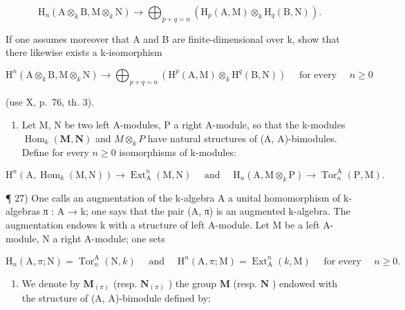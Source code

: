 \[
\mathrm{H} _ {n} (\mathrm{A} \otimes_ {k} \mathrm{B}, \mathrm{M} \otimes_ {k} \mathrm{N}) \rightarrow \bigoplus_ {p + q = n} \left(\mathrm{H} _ {p} (\mathrm{A}, \mathrm{M}) \otimes_ {k} \mathrm{H} _ {q} (\mathrm{B}, \mathrm{N})\right).
\]

If one assumes moreover that A and B are finite-dimensional over k, show that there likewise exists a k-isomorphism

\[
\mathrm{H} ^ {n} (\mathrm{A} \otimes_ {k} \mathrm{B}, \mathrm{M} \otimes_ {k} \mathrm{N}) \rightarrow \bigoplus_ {p + q = n} \left(\mathrm{H} ^ {p} (\mathrm{A}, \mathrm{M}) \otimes_ {k} \mathrm{H} ^ {q} (\mathrm{B}, \mathrm{N})\right) \quad \text { for   every } \quad n \geqslant 0
\]

(use X, p.~76, th. 3).

\begin{enumerate}
\def\labelenumi{\alph{enumi})}
\setcounter{enumi}{4}
\tightlist
\item
  Let M, N be two left A-modules, P a right A-module, so that the k-modules \(\operatorname{Hom}_{k}(\mathbf{M}, \mathbf{N})\) and \(M \otimes_{k} P\) have natural structures of (A, A)-bimodules. Define for every \(n \geqslant 0\) isomorphisms of k-modules:
\end{enumerate}

\[
\mathrm{H} ^ {n} (\mathrm{A}, \operatorname{Hom} _ {k} (\mathrm{M}, \mathrm{N})) \rightarrow \operatorname{Ext} _ {\mathrm{A}} ^ {n} (\mathrm{M}, \mathrm{N}) \quad \text { and } \quad \mathrm{H} _ {n} (\mathrm{A}, \mathrm{M} \otimes_ {k} \mathrm{P}) \rightarrow \operatorname{Tor} _ {n} ^ {\mathrm{A}} (\mathrm{P}, \mathrm{M}).
\]

¶ 27) One calls an augmentation of the k-algebra A a unital homomorphism of k-algebras π : A → k; one says that the pair (A, π) is an augmented k-algebra. The augmentation endows k with a structure of left A-module. Let M be a left A-module, N a right A-module; one sets

\[
\mathrm{H} _ {n} (\mathrm{A}, \pi ; \mathrm{N}) = \operatorname{Tor} _ {n} ^ {\mathrm{A}} (\mathrm{N}, k) \quad \text { and } \quad \mathrm{H} ^ {n} (\mathrm{A}, \pi ; \mathrm{M}) = \operatorname{Ext} _ {\mathrm{A}} ^ {n} (k, \mathrm{M}) \quad \text { for   every } \quad n \geqslant 0.
\]

\begin{enumerate}
\def\labelenumi{\alph{enumi})}
\tightlist
\item
  We denote by \(\mathbf{M}_{(\pi)}\) (resp. \(\mathbf{N}_{(\pi)}\) ) the group \(\mathbf{M}\) (resp. \(\mathbf{N}\) ) endowed with the structure of (A, A)-bimodule defined by:
\end{enumerate}

